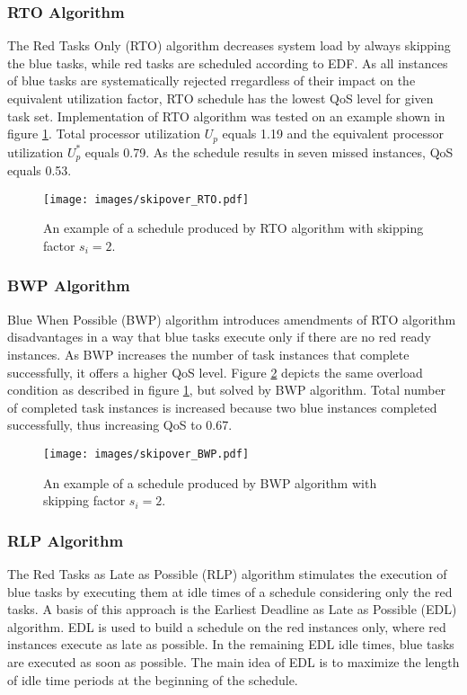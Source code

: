 \subsubsection{RTO Algorithm}
The Red Tasks Only (RTO) algorithm decreases system load by always skipping the blue tasks, while red tasks are scheduled according to EDF. 
As all instances of blue tasks are systematically rejected rregardless of their impact on the equivalent utilization factor, RTO schedule has the lowest QoS level for given task set.
Implementation of RTO algorithm was tested on an example shown in 
figure \ref{rto}.
Total processor utilization $U_p$ equals 1.19 and the equivalent processor 
utilization $U_p^\ast$ equals 0.79.
As the schedule results in seven missed instances, QoS equals 0.53. 
\\
\begin{figure}[ht]
    \centering
    \texttt{[image: images/skipover\_RTO.pdf]}
    \caption{An example of a schedule produced by RTO algorithm with skipping factor $s_i=2$.}
    \label{rto}
\end{figure}

\subsubsection{BWP Algorithm}
Blue When Possible (BWP) algorithm introduces amendments of RTO algorithm disadvantages in a way that blue tasks execute only if there are no red ready instances.
As BWP increases the number of task instances that complete successfully, it offers a higher QoS level. 
Figure \ref{bwp} depicts the same overload condition as described in figure 
\ref{rto}, but solved by BWP algorithm. 
Total number of completed task instances is increased because two blue instances completed successfully, thus increasing QoS to 0.67.
\\
\begin{figure}[ht]
    \centering
    \texttt{[image: images/skipover\_BWP.pdf]}
    \caption{An example of a schedule produced by BWP algorithm with skipping factor $s_i=2$.}
    \label{bwp}
\end{figure}

\subsubsection{RLP Algorithm}
The Red Tasks as Late as Possible (RLP) algorithm stimulates the execution of blue tasks by executing them at idle times of a schedule considering only the red tasks. 
A basis of this approach is the Earliest Deadline as Late as Possible (EDL) algorithm. 
EDL is used to build a schedule on the red instances only, where red instances execute as late as possible. 
In the remaining EDL idle times, blue tasks are executed as soon as possible. 
The main idea of EDL is to maximize the length of idle time periods at the beginning of the schedule. 

